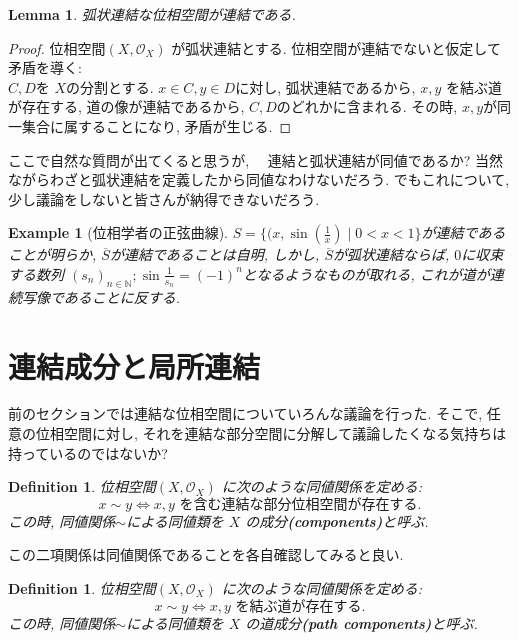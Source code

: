 \documentclass[lualatex]{ltjsbook}
\newcommand{\cl}[1]{\overline{ #1}  }
\newtheorem{lemma}[theorem]{Lemma}
\newtheorem{definition}[theorem]{Definition}
\theoremstyle{remark}
\theoremstyle{plain}
\newtheorem{example}[theorem]{Example}
\begin{document}
\begin{lemma}
	弧状連結な位相空間が連結である.
\end{lemma}

\begin{proof}
	位相空間$\left( X,  \mathcal{O}_X \right) $ が弧状連結とする. 
	位相空間が連結でないと仮定して矛盾を導く:　\\
	$C, D$を $X$の分割とする.  
	$x \in C,  y \in D$に対し, 弧状連結であるから,  $x, y$ を結ぶ道が存在する,  
	道の像が連結であるから, $C, D$のどれかに含まれる.
	その時,  $x, y$が同一集合に属することになり,  矛盾が生じる.
\end{proof}

ここで自然な質問が出てくると思うが, 　連結と弧状連結が同値であるか? 当然ながらわざと弧状連結を定義したから同値なわけないだろう.
でもこれについて,  少し議論をしないと皆さんが納得できないだろう. 

\begin{example}[位相学者の正弦曲線]
	$S=\{(x, \sin (\frac{1}{x})  \mid 0<x< 1\} $が連結であることが明らか, 
	$\cl{S}$が連結であることは自明,  しかし,   $\cl{S}$が弧状連結ならば,   $0$に収束する数列 $\left( s_n \right) _{n \in \mathbb{N}}; \sin \frac{1}{s_{n}}= (-1)^n$となるようなものが取れる,  これが道が連続写像であることに反する.
\end{example}

\section{連結成分と局所連結}

前のセクションでは連結な位相空間についていろんな議論を行った. 
そこで,  任意の位相空間に対し,  それを連結な部分空間に分解して議論したくなる気持ちは持っているのではないか?

\begin{definition}
	位相空間$\left( X ,  \mathcal{O}_{X} \right)$ に次のような同値関係を定める:\\
	$$x \sim y \iff \text{$x, y$ を含む連結な部分位相空間が存在する.}$$
	この時,  同値関係$\sim$による同値類を $X$ の成分\textbf{(components)}と呼ぶ.
\end{definition}

この二項関係は同値関係であることを各自確認してみると良い.

\begin{definition}
	位相空間$\left( X ,  \mathcal{O}_{X} \right)$ に次のような同値関係を定める:\\
	$$x \sim y \iff \text{$x, y$ を結ぶ道が存在する.}$$
	この時,  同値関係$\sim$による同値類を $X$ の道成分\textbf{(path components)}と呼ぶ.
\end{definition}
\end{document}
